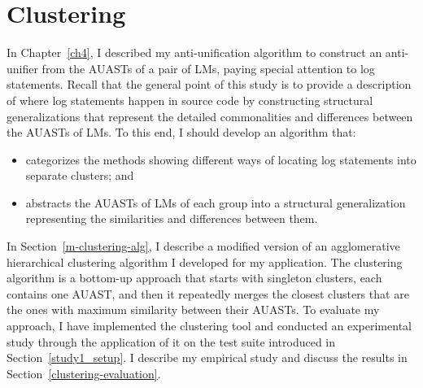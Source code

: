 \chapter{Clustering}  \label{clustering}
In Chapter~\ref{ch4}, I described my anti-unification algorithm to construct an anti-unifier from the AUASTs of a pair of LMs, paying special attention to log statements. Recall that the general point of this study is to provide a description of where log statements happen in source code by constructing structural generalizations that represent the detailed commonalities and differences between the AUASTs of LMs. To this end, I should develop an algorithm that:
\begin{itemize} [leftmargin=.5in]
\item categorizes the methods showing different ways of locating log statements into separate clusters; and
\item abstracts the AUASTs of LMs of each group into a structural generalization representing the similarities and differences between them.
\end{itemize}

In Section~\ref{m-clustering-alg}, I describe a modified version of an agglomerative hierarchical clustering algorithm I developed for my application. The clustering algorithm is a bottom-up approach that starts with singleton clusters, each contains one AUAST, and then it repeatedly merges the closest clusters that are the ones with maximum similarity between their AUASTs. To evaluate my approach, I have implemented the clustering tool and conducted an experimental study through the application of it on the test suite introduced in Section~\ref{study1_setup}. I describe my empirical study and discuss the results in Section~\ref{clustering-evaluation}.



